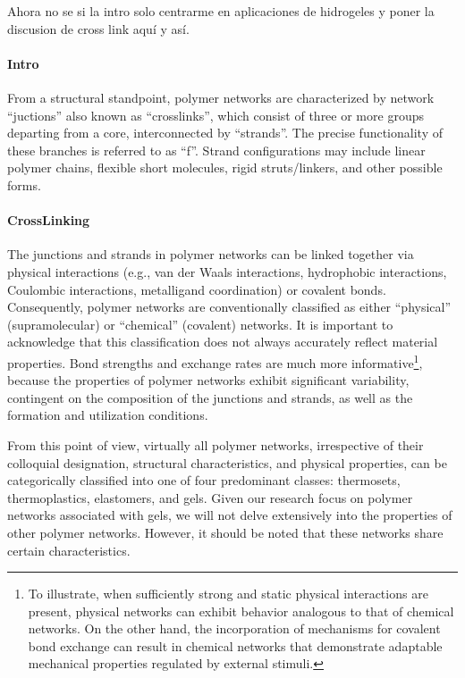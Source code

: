 Ahora no se si la intro solo centrarme en aplicaciones de hidrogeles y poner la discusion de cross link aquí y así.


\paragraph{Intro} From a structural standpoint, polymer networks are characterized by network ``juctions'' also known as ``crosslinks'', which consist of three or more groups departing from a core, interconnected by ``strands''.
The precise functionality of these branches is referred to as ``f''.
Strand configurations may include linear polymer chains, flexible short molecules, rigid struts/linkers, and other possible forms\citep{guPolymerNetworksPlastics2020}.

\paragraph{CrossLinking} The junctions and strands in polymer networks can be linked together via physical interactions (e.g., van der Waals interactions, hydrophobic interactions, Coulombic interactions, metalligand coordination) or covalent bonds.
Consequently, polymer networks are conventionally classified as either ``physical'' (supramolecular) or ``chemical'' (covalent) networks.
It is important to acknowledge that this classification does not always accurately reflect material properties. 
Bond strengths and exchange rates are much more informative\footnote{To illustrate, when sufficiently strong and static physical interactions are present, physical networks can exhibit behavior analogous to that of chemical networks. 
On the other hand, the incorporation of mechanisms for covalent bond exchange can result in chemical networks that demonstrate adaptable mechanical properties regulated by external stimuli.},
because the properties of polymer networks exhibit significant variability, contingent on the composition of the junctions and strands, as well as the formation and utilization conditions.

From this point of view, virtually all polymer networks, irrespective of their colloquial designation, structural characteristics, and physical properties, can be categorically classified into one of four predominant classes: thermosets, thermoplastics, elastomers, and gels\citep{guPolymerNetworksPlastics2020}.
Given our research focus on polymer networks associated with gels, we will not delve extensively into the properties of other polymer networks. 
However, it should be noted that these networks share certain characteristics.

